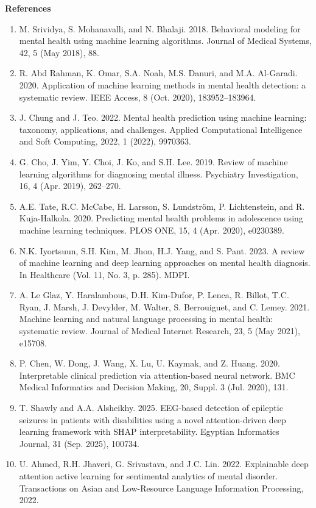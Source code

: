 \documentclass[conference]{IEEEtran}
\begin{document}
\textbf{References}

\begin{enumerate}
\def\labelenumi{\arabic{enumi}.}
\item
  M. Srividya, S. Mohanavalli, and N. Bhalaji. 2018. Behavioral modeling for mental health using machine learning algorithms. Journal of Medical Systems, 42, 5 (May 2018), 88.
\item
  R. Abd Rahman, K. Omar, S.A. Noah, M.S. Danuri, and M.A. Al-Garadi. 2020. Application of machine learning methods in mental health detection: a systematic review. IEEE Access, 8 (Oct. 2020), 183952--183964.
\item
  J. Chung and J. Teo. 2022. Mental health prediction using machine learning: taxonomy, applications, and challenges. Applied Computational Intelligence and Soft Computing, 2022, 1 (2022), 9970363.
\item
  G. Cho, J. Yim, Y. Choi, J. Ko, and S.H. Lee. 2019. Review of machine learning algorithms for diagnosing mental illness. Psychiatry Investigation, 16, 4 (Apr. 2019), 262--270.
\item
  A.E. Tate, R.C. McCabe, H. Larsson, S. Lundström, P. Lichtenstein, and R. Kuja-Halkola. 2020. Predicting mental health problems in adolescence using machine learning techniques. PLOS ONE, 15, 4 (Apr. 2020), e0230389.
\item
  N.K. Iyortsuun, S.H. Kim, M. Jhon, H.J. Yang, and S. Pant. 2023. A review of machine learning and deep learning approaches on mental health diagnosis. In Healthcare (Vol. 11, No. 3, p. 285). MDPI.
\item
  A. Le Glaz, Y. Haralambous, D.H. Kim-Dufor, P. Lenca, R. Billot, T.C. Ryan, J. Marsh, J. Devylder, M. Walter, S. Berrouiguet, and C. Lemey. 2021. Machine learning and natural language processing in mental health: systematic review. Journal of Medical Internet Research, 23, 5 (May 2021), e15708.
\item
  P. Chen, W. Dong, J. Wang, X. Lu, U. Kaymak, and Z. Huang. 2020. Interpretable clinical prediction via attention-based neural network. BMC Medical Informatics and Decision Making, 20, Suppl. 3 (Jul. 2020), 131.
\item
  T. Shawly and A.A. Alsheikhy. 2025. EEG-based detection of epileptic seizures in patients with disabilities using a novel attention-driven deep learning framework with SHAP interpretability. Egyptian Informatics Journal, 31 (Sep. 2025), 100734.
\item
  U. Ahmed, R.H. Jhaveri, G. Srivastava, and J.C. Lin. 2022. Explainable deep attention active learning for sentimental analytics of mental disorder. Transactions on Asian and Low-Resource Language Information Processing, 2022.

\end{enumerate}
\end{document}
